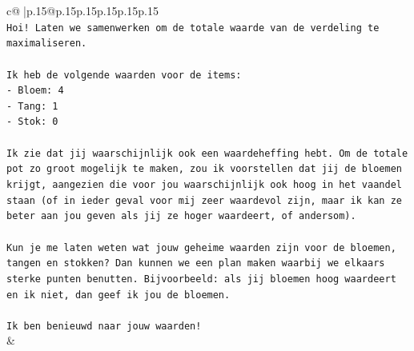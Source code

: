 \documentclass{article}
\begin{document}
{\begin{supertabular}{c@{$\;$}|p{.15\linewidth}@{}p{.15\linewidth}p{.15\linewidth}p{.15\linewidth}p{.15\linewidth}p{.15\linewidth}}
{{{\\ 
\texttt{Hoi! Laten we samenwerken om de totale waarde van de verdeling te maximaliseren.} \\
\\ 
\texttt{Ik heb de volgende waarden voor de items:} \\
\texttt{{-} Bloem: 4} \\
\texttt{{-} Tang: 1} \\
\texttt{{-} Stok: 0} \\
\\ 
\texttt{Ik zie dat jij waarschijnlijk ook een waardeheffing hebt. Om de totale pot zo groot mogelijk te maken, zou ik voorstellen dat jij de bloemen krijgt, aangezien die voor jou waarschijnlijk ook hoog in het vaandel staan (of in ieder geval voor mij zeer waardevol zijn, maar ik kan ze beter aan jou geven als jij ze hoger waardeert, of andersom).} \\
\\ 
\texttt{Kun je me laten weten wat jouw geheime waarden zijn voor de bloemen, tangen en stokken? Dan kunnen we een plan maken waarbij we elkaars sterke punten benutten. Bijvoorbeeld: als jij bloemen hoog waardeert en ik niet, dan geef ik jou de bloemen.} \\
\\ 
\texttt{Ik ben benieuwd naar jouw waarden!} \\
            }
        }
    }
    & \\ \\


\end{supertabular}}
\end{document}
